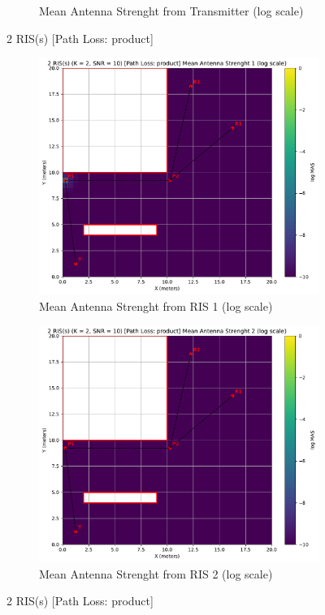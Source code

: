 \begin{figure}[H]
\begin{subfigure}[b]{0.48\textwidth}
    \caption{Mean Antenna Strenght from Transmitter (log scale)}
  \end{subfigure}
  \caption{2 RIS(s) [Path Loss: product]}
  \medskip
  \centering
  \begin{subfigure}[b]{0.48\textwidth}
    \centering
    \includegraphics[width=\textwidth]{imgs/heatmap-simulations/2 RIS(s) (K = 2, SNR = 10) [Path Loss: product] Mean Antenna Strenght 1 (log scale).pdf}
    \caption{Mean Antenna Strenght from RIS 1 (log scale)}
  \end{subfigure}
  \hfill
  \begin{subfigure}[b]{0.48\textwidth}
    \centering
    \includegraphics[width=\textwidth]{imgs/heatmap-simulations/2 RIS(s) (K = 2, SNR = 10) [Path Loss: product] Mean Antenna Strenght 2 (log scale).pdf}
    \caption{Mean Antenna Strenght from RIS 2 (log scale)}
  \end{subfigure}
  \caption{2 RIS(s) [Path Loss: product]}
\end{figure}


